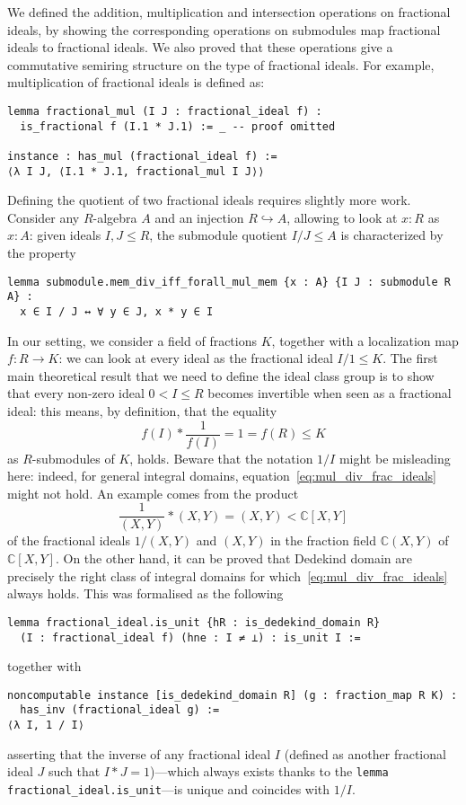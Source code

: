 \documentclass[a4paper,USenglish,cleveref, autoref, thm-restate]{lipics-v2021}
\newcommand{\C}{\mathbb{C}}
\newcommand{\lean}[1]{\texttt{#1}\xspace} %
\newcommand{\mathlib}{\textsf{mathlib}\xspace}
\begin{document}
We defined the addition, multiplication and intersection operations on fractional ideals,
by showing the corresponding operations on submodules map fractional ideals to fractional ideals.
We also proved that these operations give a commutative semiring structure on the type of fractional ideals.
For example, multiplication of fractional ideals is defined as:
\begin{lstlisting}
lemma fractional_mul (I J : fractional_ideal f) :
  is_fractional f (I.1 * J.1) := _ -- proof omitted

instance : has_mul (fractional_ideal f) :=
⟨λ I J, ⟨I.1 * J.1, fractional_mul I J⟩⟩
\end{lstlisting}

Defining the quotient of two fractional ideals requires slightly more work. Consider any $R$-algebra $A$ and an injection $R\hookrightarrow A$, allowing to look at $x:R$ as $x:A$: given ideals $I,J\le R$, the submodule quotient $I / J\le A$ %
is characterized by the property
\begin{lstlisting}
lemma submodule.mem_div_iff_forall_mul_mem {x : A} {I J : submodule R A} :
  x ∈ I / J ↔ ∀ y ∈ J, x * y ∈ I
\end{lstlisting}
In our setting, we consider a field of fractions $K$, together with a localization map $f\colon R\to K$: we can look at every ideal as the fractional ideal $I/1 \le K$. The first main theoretical result that we need to define the ideal class group is to show that every non-zero ideal $0<I \le R$ becomes invertible when seen as a fractional ideal: this means, by definition, that the equality 
\begin{equation}\label{eq:mul_div_frac_ideals}
f(I) \ast \frac{1}{f(I)} = 1=f(R)\le K
\end{equation}
as $R$-submodules of $K$, holds. Beware that the notation $1/I$ might be misleading here: indeed, for general integral domains, equation~\eqref{eq:mul_div_frac_ideals} might not hold. An example comes from the product
\[
\frac{1}{(X,Y)}\ast (X,Y)=(X,Y)<\C[X,Y]
\]
of the fractional ideals $1/(X,Y)$ and $(X,Y)$ in the fraction field $\C(X,Y)$ of $\C[X,Y]$. On the other hand, it can be proved that Dedekind domain are precisely the right class of integral domains for which~\eqref{eq:mul_div_frac_ideals} always holds. This was formalised as the following
\begin{lstlisting}
lemma fractional_ideal.is_unit {hR : is_dedekind_domain R}
  (I : fractional_ideal f) (hne : I ≠ ⊥) : is_unit I :=
\end{lstlisting}
together with
\begin{lstlisting}
noncomputable instance [is_dedekind_domain R] (g : fraction_map R K) :
  has_inv (fractional_ideal g) :=
⟨λ I, 1 / I⟩
\end{lstlisting}
asserting that the inverse of any fractional ideal $I$ (defined as another fractional ideal $J$ such that $I\ast J=1$)---which always exists thanks to the \lean{lemma fractional\_ideal.is\_unit}---is unique and coincides with $1/I$.
\end{document}
